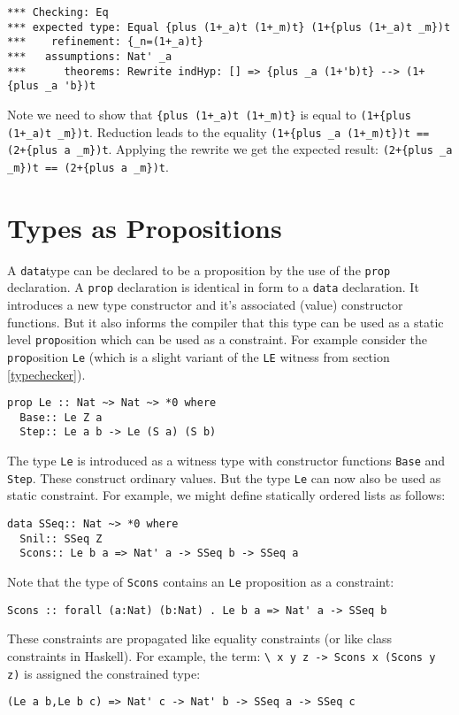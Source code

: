 \documentclass[11pt,twoside]{article}
\begin{document}
\begin{verbatim}
*** Checking: Eq
*** expected type: Equal {plus (1+_a)t (1+_m)t} (1+{plus (1+_a)t _m})t
***    refinement: {_n=(1+_a)t}
***   assumptions: Nat' _a
***      theorems: Rewrite indHyp: [] => {plus _a (1+'b)t} --> (1+{plus _a 'b})t
\end{verbatim}

Note we need to show that \verb|{plus (1+_a)t (1+_m)t}|
is equal to \verb|(1+{plus (1+_a)t _m})t|. Reduction leads to the equality
\verb|(1+{plus _a (1+_m)t})t == (2+{plus a _m})t|. Applying the rewrite
we get the expected result: \verb|(2+{plus _a _m})t == (2+{plus a _m})t|.

\section{Types as Propositions}

A {\tt data}type can be declared to be a proposition by the use
of the {\tt prop} declaration. A {\tt prop} declaration is 
identical in form to a {\tt data} declaration. It introduces
a new type constructor and it's associated (value) constructor functions.
But it also informs the compiler that this type can be used as
a static level {\tt prop}osition which can be used as a constraint.
For example consider the {\tt prop}osition {\tt Le} (which is a slight
variant of the {\tt LE} witness from section \ref{typechecker}).
\begin{verbatim}
prop Le :: Nat ~> Nat ~> *0 where
  Base:: Le Z a
  Step:: Le a b -> Le (S a) (S b)
\end{verbatim}
The type {\tt Le} is introduced as a witness type with constructor
functions {\tt Base} and {\tt Step}. These construct ordinary values.
But the type {\tt Le} can now also be used as static constraint.
For example, we might define statically ordered lists as follows:

\begin{verbatim}
data SSeq:: Nat ~> *0 where
  Snil:: SSeq Z
  Scons:: Le b a => Nat' a -> SSeq b -> SSeq a
\end{verbatim}
Note that the type of {\tt Scons} contains an {\tt Le}
proposition as a constraint:

\begin{verbatim}
Scons :: forall (a:Nat) (b:Nat) . Le b a => Nat' a -> SSeq b
\end{verbatim}

These constraints are propagated like equality constraints
(or like class constraints in Haskell). For example, the
term: \verb+\ x y z -> Scons x (Scons y z)+ is assigned the 
constrained type:
\begin{verbatim}
(Le a b,Le b c) => Nat' c -> Nat' b -> SSeq a -> SSeq c
\end{verbatim}
\end{document}
